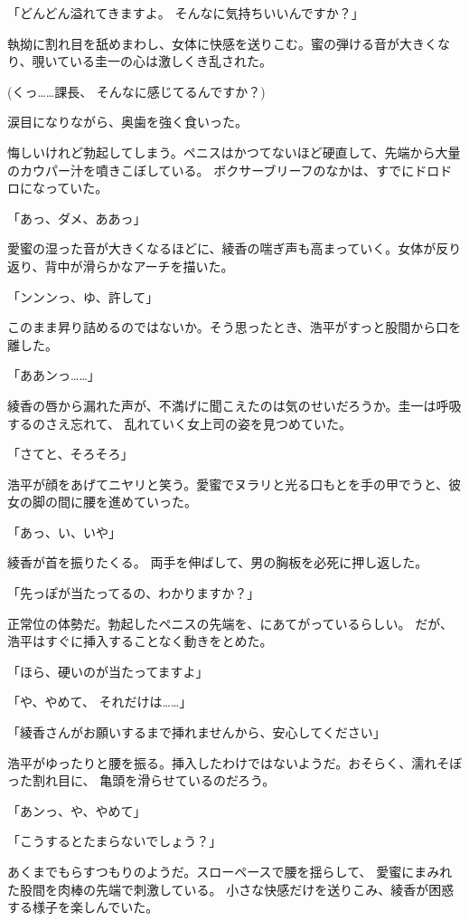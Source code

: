 ﻿\documentclass[
    book,tate,
    line_length=30zw,
    jafontsize=12pt,
    paper=b5j,
    landscape,
    ]{jlreq}
\begin{document}
「どんどん溢れてきますよ。 そんなに気持ちいいんですか？」

執拗に割れ目を舐めまわし、女体に快感を送りこむ。蜜の弾ける音が大きくなり、覗いている圭一の心は激しくき乱された。

(くっ……課長、 そんなに感じてるんですか？)

涙目になりながら、奥歯を強く食いった。

悔しいけれど勃起してしまう。ペニスはかつてないほど硬直して、先端から大量のカウパー汁を噴きこぼしている。
ボクサーブリーフのなかは、すでにドロドロになっていた。

「あっ、ダメ、ああっ」

愛蜜の湿った音が大きくなるほどに、綾香の喘ぎ声も高まっていく。女体が反り返り、背中が滑らかなアーチを描いた。

「ンンンっ、ゆ、許して」

このまま昇り詰めるのではないか。そう思ったとき、浩平がすっと股間から口を離した。

「ああンっ……」

綾香の唇から漏れた声が、不満げに聞こえたのは気のせいだろうか。圭一は呼吸するのさえ忘れて、
乱れていく女上司の姿を見つめていた。

「さてと、そろそろ」

浩平が顔をあげてニヤリと笑う。愛蜜でヌラリと光る口もとを手の甲でうと、彼女の脚の間に腰を進めていった。

「あっ、い、いや」

綾香が首を振りたくる。 両手を伸ばして、男の胸板を必死に押し返した。

「先っぽが当たってるの、わかりますか？」

正常位の体勢だ。勃起したペニスの先端を、にあてがっているらしい。
だが、浩平はすぐに挿入することなく動きをとめた。

「ほら、硬いのが当たってますよ」

「や、やめて、 それだけは……」

「綾香さんがお願いするまで挿れませんから、安心してください」

浩平がゆったりと腰を振る。挿入したわけではないようだ。おそらく、濡れそぼった割れ目に、
亀頭を滑らせているのだろう。

「あンっ、や、やめて」

「こうするとたまらないでしょう？」

あくまでもらすつもりのようだ。スローペースで腰を揺らして、
愛蜜にまみれた股間を肉棒の先端で刺激している。 小さな快感だけを送りこみ、綾香が困惑する様子を楽しんでいた。
\end{document}
